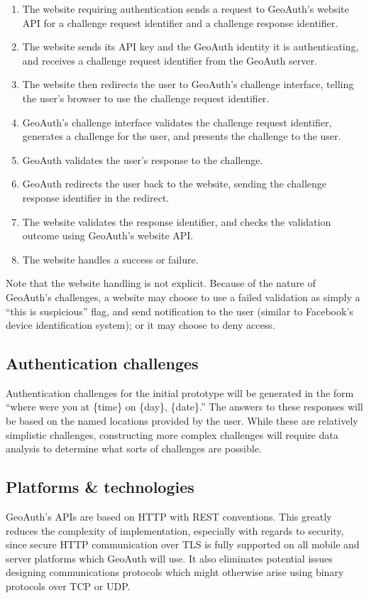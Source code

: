 \documentclass[11pt]{article} %
\begin{document}
\begin{enumerate}
\item The website requiring authentication sends a request to GeoAuth's website API for a challenge request identifier and a challenge response identifier.
\item The website sends its API key and the GeoAuth identity it is authenticating, and receives a challenge request identifier from the GeoAuth server.
\item The website then redirects the user to GeoAuth's challenge interface, telling the user's browser to use the challenge request identifier.
\item GeoAuth's challenge interface validates the challenge request identifier, generates a challenge for the user, and presents the challenge to the user.
\item GeoAuth validates the user's response to the challenge.
\item GeoAuth redirects the user back to the website, sending the challenge response identifier in the redirect.
\item The website validates the response identifier, and checks the validation outcome using GeoAuth's website API.
\item The website handles a success or failure.
\end{enumerate}

Note that the website handling is not explicit. Because of the nature of GeoAuth's challenges, a website may choose to use a failed validation as simply a ``this is suspicious'' flag, and send notification to the user (similar to Facebook's device identification system); or it may choose to deny access.

\subsection{Authentication challenges}
Authentication challenges for the initial prototype will be generated in the form ``where were you at \{time\} on \{day\}, \{date\}.'' The answers to these responses will be based on the named locations provided by the user. While these are relatively simplistic challenges, constructing more complex challenges will require data analysis to determine what sorts of challenges are possible.

\subsection{Platforms \& technologies}
GeoAuth's APIs are based on HTTP with REST conventions. This greatly reduces the complexity of implementation, especially with regards to security, since secure HTTP communication over TLS is fully supported on all mobile and server platforms which GeoAuth will use. It also eliminates potential issues designing communications protocols which might otherwise arise using binary protocols over TCP or UDP.
\end{document}
